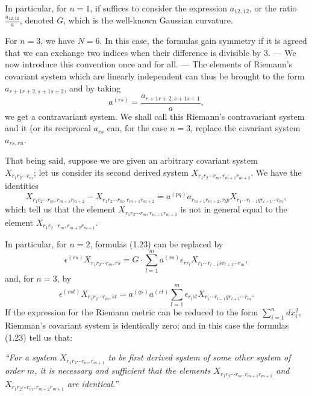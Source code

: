 \documentclass{book}
\begin{document}
In particular, for $n=1$, if suffices to consider the expression $a_{12,12}$, or the ratio $\frac{a_{12,12}}{a}$, denoted $G$, which is the well-known Gaussian curvature. 

For $n=3$, we have $N=6$. In this case, the formulas gain symmetry if it is agreed that we can exchange two indices when their difference is divisible by 3. --- We now introduce this convention once and for all. --- The elements of Riemann's covariant system which are linearly independent can thus be brought to the form $a_{r+1r+2,s+1s+2}$, and by taking 
$$a^{(rs)}=\frac{a_{r+1r+2,s+1s+1}}{a},$$
we get a contravariant system. We shall call this Riemann's contravariant system and it (or its reciprocal $a_{rs}$ can, for the case $n=3$, replace the covariant system $a_{rs,ru}$.

That being said, suppose we are given an arbitrary covariant system \\$X_{r_1r_2\cdots r_m}$; let us consider its second derived system $X_{r_1r_2\cdots r_m,r_{m+1}r_{m+2}}$. We have the identities
\begin{equation}
X_{r_1r_2\cdots r_m,r_{m+1}r_{m+2}}-X_{r_1r_2\cdots r_m,r_{m+1}r_{m+2}}=a^{(pq)}a_{r_{m+1}r_{m+2},r_lp}X_{r_1\cdots r_{l-1}qr_{l+1}\cdots r_m},
\end{equation}
which tell us that the element $X_{r_1r_2\cdots r_m,r_{m+1}r_{m+2}}$ is not in general equal to the element $X_{r_1r_2\cdots r_m,r_{m+2}r_{m+1}}$.

In particular, for $n=2$, formulas (1.23) can be replaced by
\begin{equation*}
\tag{1.23'}
\epsilon^{(rs)}X_{r_1r_2\cdots r_m,rs}=G\cdot\sum_{l=1}^ma^{(rs)}\epsilon_{rr_l}X_{r_1\cdots r_{l-1}sr_{l+1}\cdots r_m},
\end{equation*}
and, for $n=3$, by
\begin{equation*}
\tag{1.23''}
\epsilon^{(rst)}X_{r_1r_2\cdots r_m,st}=a^{(qs)}a^{(rt)}\sum_{l=1}^{m}\epsilon_{r_lst}X_{r_1\cdots r_{l-1}qr_{l+1}\cdots r_m}.
\end{equation*}
If the expression for the Riemann metric can be reduced to the form $\displaystyle\sum_{i=1}^ndx_i^2,$ Riemman's covariant system is identically zero; and in this case the formulas (1.23) tell us that:

\emph{``For a system $X_{r_1r_2\cdots r_m,r_{m+1}}$ to be first derived system of some other system of order $m$, it is necessary and sufficient that the elements $X_{r_1r_2\cdots r_m,r_{m+1}r_{m+2}}$ and $X_{r_1r_2\cdots r_m,r_{m+2}r_{m+1}}$ are identical.''}
\end{document}
